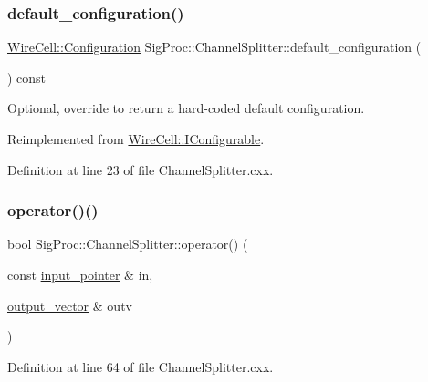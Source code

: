 \subsubsection{\texorpdfstring{default\+\_\+configuration()}{default\_configuration()}}
{\footnotesize\ttfamily \hyperlink{namespace_wire_cell_a9f705541fc1d46c608b3d32c182333ee}{Wire\+Cell\+::\+Configuration} Sig\+Proc\+::\+Channel\+Splitter\+::default\+\_\+configuration (\begin{DoxyParamCaption}{ }\end{DoxyParamCaption}) const\hspace{0.3cm}{\ttfamily [virtual]}}



Optional, override to return a hard-\/coded default configuration. 



Reimplemented from \hyperlink{class_wire_cell_1_1_i_configurable_a54841b2da3d1ea02189478bff96f7998}{Wire\+Cell\+::\+I\+Configurable}.



Definition at line 23 of file Channel\+Splitter.\+cxx.

\mbox{\label{class_wire_cell_1_1_sig_proc_1_1_channel_splitter_a715114dbeb142744c3a140a902907ff0}} 
\subsubsection{\texorpdfstring{operator()()}{operator()()}}
{\footnotesize\ttfamily bool Sig\+Proc\+::\+Channel\+Splitter\+::operator() (\begin{DoxyParamCaption}\item[{const \hyperlink{class_wire_cell_1_1_i_fanout_node_aefd36d56a531edf1990fe6e263d9c266}{input\+\_\+pointer} \&}]{in,  }\item[{\hyperlink{class_wire_cell_1_1_i_fanout_node_a650cda83709781daac2d67af7c3706df}{output\+\_\+vector} \&}]{outv }\end{DoxyParamCaption})\hspace{0.3cm}{\ttfamily [virtual]}}



Definition at line 64 of file Channel\+Splitter.\+cxx.

